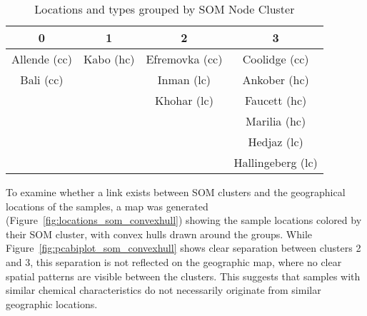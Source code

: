 \begin{table}[h!]
\centering
\caption{Locations and types grouped by SOM Node Cluster}
\label{tab:som_clusters}
\begin{tabular}{cccc}
\toprule
0 & 1 & 2 & 3 \\
\midrule
Allende (cc)  & Kabo (hc) & Efremovka (cc)  & Coolidge (cc) \\
Bali (cc)     &           & Inman (lc)      & Ankober (hc) \\
              &           & Khohar (lc)     & Faucett (hc) \\
              &           &                 & Marilia (hc) \\
              &           &                 & Hedjaz (lc) \\
              &           &                 & Hallingeberg (lc) \\
\bottomrule
\end{tabular}
\end{table}

To examine whether a link exists between SOM clusters and the geographical locations of the samples, a map was generated (Figure~\ref{fig:locations_som_convexhull}) showing the sample locations colored by their SOM cluster, with convex hulls drawn around the groups. While Figure~\ref{fig:pcabiplot_som_convexhull} shows clear separation between clusters 2 and 3, this separation is not reflected on the geographic map, where no clear spatial patterns are visible between the clusters. This suggests that samples with similar chemical characteristics do not necessarily originate from similar geographic locations.






